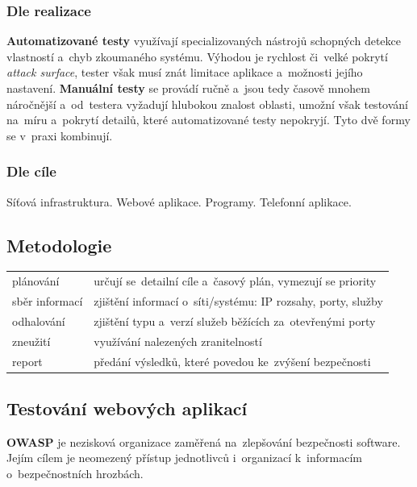 \subsubsection*{Dle realizace}

\textbf{Automatizované testy} využívají specializovaných nástrojů schopných detekce vlastností a~chyb zkoumaného systému. Výhodou je rychlost či~velké pokrytí \emph{attack surface}, tester však musí znát limitace aplikace a~možnosti jejího nastavení. \textbf{Manuální testy} se provádí ručně a~jsou tedy časově mnohem náročnější a~od~testera vyžadují hlubokou znalost oblasti, umožní však testování na~míru a~pokrytí detailů, které automatizované testy nepokryjí. Tyto dvě formy se v~praxi kombinují.

\subsubsection*{Dle cíle}

Síťová infrastruktura. Webové aplikace. Programy. Telefonní aplikace.

\subsection{Metodologie}

\begin{table}[ht]
\centering
\begin{tabular}{p{3cm}|p{12cm}}
plánování      & určují se~detailní cíle a~časový plán, vymezují se priority \\
sběr informací & zjištění informací o~síti/systému: IP rozsahy, porty, služby \\
odhalování     & zjištění typu a~verzí služeb běžících za~otevřenými porty \\
zneužití       & využívání nalezených zranitelností \\
report         & předání výsledků, které povedou ke~zvýšení bezpečnosti \\
\end{tabular}
\end{table}

\subsection{Testování webových aplikací}

\textbf{OWASP} je nezisková organizace zaměřená na~zlepšování bezpečnosti software. Jejím cílem je neomezený přístup jednotlivců i~organizací k~informacím o~bezpečnostních hrozbách.

